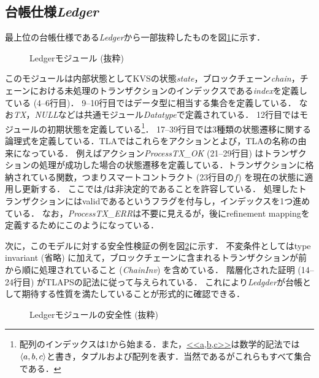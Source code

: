 \documentclass{fose2019}           %
\begin{document}
\subsection{台帳仕様\textit{Ledger}}
最上位の台帳仕様である\textit{Ledger}から一部抜粋したものを図\ref{fig:led}に示す．
\begin{figure}[t!pbh]
\centering
\begin{minipage}{0.95\linewidth}

\caption{Ledgerモジュール (抜粋)}\label{fig:led}
\end{minipage}
\end{figure}

このモジュールは内部状態としてKVSの状態\textit{state}，ブロックチェーン\textit{chain}，チェーンにおける未処理のトランザクションのインデックスである\textit{index}を定義している (4--6行目)．
9--10行目ではデータ型に相当する集合を定義している．
なお\textit{TX}，\textit{NULL}などは共通モジュール\textit{Datatype}で定義されている．
12行目ではモジュールの初期状態を定義している\footnote{配列のインデックスは1から始まる．また，\url{<<a,b,c>>}は数学的記法では$\langle a,b,c \rangle$と書き，タプルおよび配列を表す．当然であるがこれらもすべて集合である．}．
17--39行目では3種類の状態遷移に関する論理式を定義している．TLAではこれらをアクションとよび，TLAの名称の由来になっている．
例えばアクション\textit{ProcessTX\_OK} (21--29行目) はトランザクションの処理が成功した場合の状態遷移を定義している．トランザクションに格納されている関数，つまりスマートコントラクト (23行目の$f$) を現在の状態に適用し更新する．
ここでは$f$は非決定的であることを許容している．
処理したトランザクションにはvalidであるというフラグを付与し，インデックスを1つ進めている．
なお，\textit{ProcessTX\_ERR}は不要に見えるが，後にrefinement mappingを定義するためにこのようになっている．

次に，このモデルに対する安全性検証の例を図\ref{fig:ledinv}に示す．
不変条件としてはtype invariant (省略) に加えて，ブロックチェーンに含まれるトランザクションが前から順に処理されていること (\textit{ChainInv}) を含めている．
階層化された証明 (14--24行目) がTLAPSの記法に従って与えられている．
これにより\textit{Ledgder}が台帳として期待する性質を満たしていることが形式的に確認できる．
\begin{figure}[t!pbh]
\centering
\begin{minipage}{0.95\linewidth}

\caption{Ledgerモジュールの安全性 (抜粋)}\label{fig:ledinv}
\end{minipage}
\end{figure}
\end{document}

